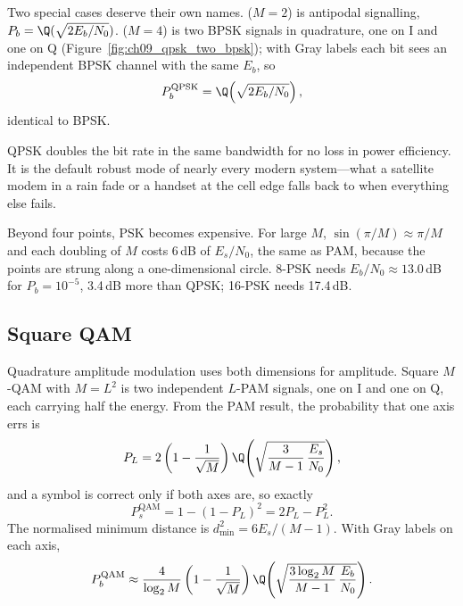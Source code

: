 Two special cases deserve their own names.  ($M=2$) is antipodal signalling,
$P_b=\Q(\sqrt{2E_b/N_0})$.  ($M=4$) is two BPSK signals in quadrature, one on I and one
on Q (Figure~\ref{fig:ch09_qpsk_two_bpsk}); with Gray labels each bit sees an independent BPSK
channel with the same $E_b$, so
\begin{equation}
P_b^{\text{QPSK}}=\Q\!\left(\sqrt{2E_b/N_0}\right),
\end{equation}
identical to BPSK.


\begin{keyidea}
QPSK doubles the bit rate in the same bandwidth for no loss in power efficiency. It is the
default robust mode of nearly every modern system---what a satellite modem in a rain fade or a
handset at the cell edge falls back to when everything else fails.
\end{keyidea}

Beyond four points, PSK becomes expensive. For large $M$, $\sin(\pi/M)\approx\pi/M$ and each
doubling of $M$ costs 6\,dB of $E_s/N_0$, the same as PAM, because the points are strung along a
one-dimensional circle. 8-PSK needs $E_b/N_0\approx13.0$\,dB for $P_b=10^{-5}$, 3.4\,dB more than
QPSK; 16-PSK needs 17.4\,dB.

\subsection{Square QAM}

Quadrature amplitude modulation uses both dimensions for amplitude. Square $M$-QAM with $M=L^2$
is two independent $L$-PAM signals, one on I and one on Q, each carrying half the energy. From the
PAM result, the probability that one axis errs is
\begin{equation}
P_L=2\left(1-\frac1{\sqrt M}\right)\Q\!\left(\sqrt{\frac{3}{M-1}\,\frac{E_s}{N_0}}\right),
\end{equation}
and a symbol is correct only if both axes are, so exactly
\begin{equation}
P_s^{\text{QAM}}=1-(1-P_L)^2=2P_L-P_L^2 .
\label{eq:ch09:qam}
\end{equation}
The normalised minimum distance is $d_{\min}^2=6E_s/(M-1)$. With Gray labels on each axis,
\begin{equation}
P_b^{\text{QAM}}\approx\frac4{\log_2M}\left(1-\frac1{\sqrt M}\right)
\Q\!\left(\sqrt{\frac{3\log_2M}{M-1}\,\frac{E_b}{N_0}}\right).
\label{eq:ch09:qamber}
\end{equation}

